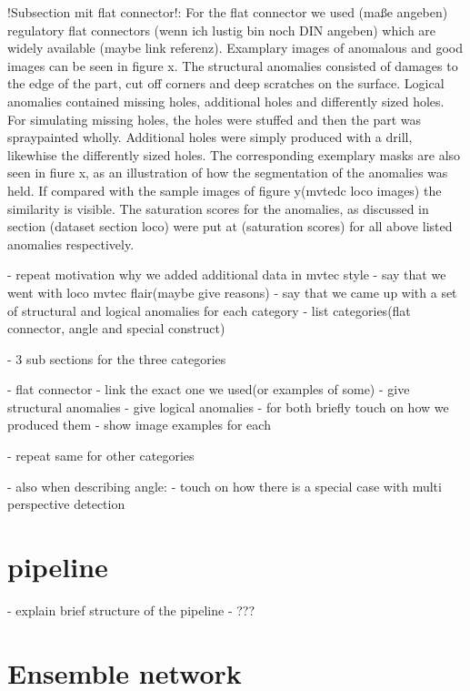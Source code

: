 !Subsection mit flat connector!:
For the flat connector we used (maße angeben) regulatory flat connectors (wenn ich lustig bin noch DIN angeben) which are widely available (maybe link referenz). 
Examplary images of anomalous and good images can be seen in figure x. The structural anomalies consisted of damages to the edge of the part, cut off corners and deep scratches on the surface. 
Logical anomalies contained missing holes, additional holes and differently sized holes. For simulating missing holes, the holes were stuffed and then the part was spraypainted wholly. 
Additional holes were simply produced with a drill, likewhise the differently sized holes. 
The corresponding exemplary masks are also seen in fiure x, as an illustration of how the segmentation of the anomalies was held. If compared with the sample images of figure y(mvtedc loco images) 
the similarity is visible. The saturation scores for the anomalies, as discussed in section (dataset section loco) were put at (saturation scores) for all above listed anomalies respectively.



- repeat motivation why we added additional data in mvtec style
- say that we went with loco mvtec flair(maybe give reasons)
- say that we came up with a set of structural and logical anomalies for each category
- list categories(flat connector, angle and special construct)

- 3 sub sections for the three categories

- flat connector
- link the exact one we used(or examples of some)
- give structural anomalies
- give logical anomalies
- for both briefly touch on how we produced them
- show image examples for each

- repeat same for other categories

- also when describing angle:
- touch on how there is a special case with multi perspective detection





\section{pipeline}
- explain brief structure of the pipeline
- ???


\section{Ensemble network}

